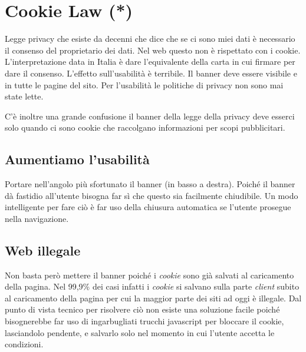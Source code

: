 
\chapter{Cookie Law (*)}
	Legge privacy che esiste da decenni che dice che se ci sono miei dati è necessario il consenso del proprietario dei dati. Nel web questo non è rispettato con i cookie. L'interpretazione data in Italia è dare l'equivalente della carta in cui firmare per dare il consenso.
	L'effetto sull'usabilità è terribile. Il banner deve essere visibile e in tutte le pagine del sito. Per l'usabilità le politiche di privacy non sono mai state lette.
	
	C'è inoltre una grande confusione il banner della legge della privacy deve esserci solo quando ci sono cookie che raccolgano informazioni per scopi pubblicitari.
	
	\section{Aumentiamo l'usabilità}
		Portare nell'angolo più sfortunato il banner (in basso a destra).
		Poiché il banner dà fastidio all'utente bisogna far sì che questo sia facilmente chiudibile. Un modo intelligente per fare ciò è far uso della chiusura automatica se l'utente prosegue nella navigazione.
		
	\section{Web illegale}
		Non basta però mettere il banner poiché i \emph{cookie} sono già salvati al caricamento della pagina. Nel 99,9\% dei casi infatti i \emph{cookie} si salvano sulla parte \emph{client} subito al caricamento della pagina per cui la maggior parte dei siti ad oggi è illegale. Dal punto di vista tecnico per risolvere ciò non esiste una soluzione facile poiché bisognerebbe far uso di ingarbugliati trucchi javascript per bloccare il cookie, lasciandolo pendente, e salvarlo solo nel momento in cui l'utente accetta le condizioni.